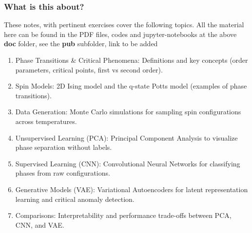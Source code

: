 \documentclass{beamer}
\begin{document}
\begin{frame}
\frametitle{What is this about?}

\begin{block}{}
These notes, with pertinent exercises cover the following topics. All the material here can be found in the PDF files, codes and jupyter-notebooks at the above \textbf{doc} folder, see the \textbf{pub} subfolder, link to be added  
\begin{enumerate}
\item Phase Transitions {\&} Critical Phenomena: Definitions and key concepts (order parameters, critical points, first vs second order).

\item Spin Models: 2D Ising model and the q-state Potts model (examples of phase transitions).

\item Data Generation: Monte Carlo simulations for sampling spin configurations across temperatures.

\item Unsupervised Learning (PCA): Principal Component Analysis to visualize phase separation without labels.

\item Supervised Learning (CNN): Convolutional Neural Networks for classifying phases from raw configurations.

\item Generative Models (VAE): Variational Autoencoders for latent representation learning and critical anomaly detection.

\item Comparisons: Interpretability and performance trade-offs between PCA, CNN, and VAE.
\end{enumerate}

\noindent
\end{block}
\end{frame}
\end{document}
